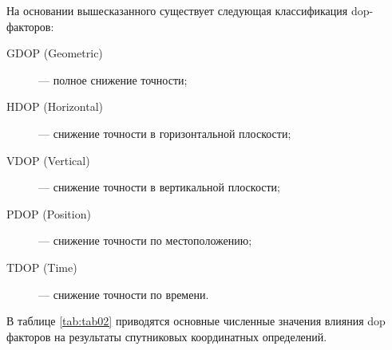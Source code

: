 \vspace{5mm}

На основании вышесказанного существует следующая классификация dop-факторов:

\begin{description}
	\item [GDOP (Geometric)] --- полное снижение точности;
	\item [HDOP (Horizontal)] --- снижение точности в горизонтальной плоскости;
	\item [VDOP (Vertical)] --- снижение точности в вертикальной плоскости;
	\item [PDOP (Position)] --- снижение точности по местоположению;
	\item [TDOP (Time)] --- снижение точности по времени.
\end{description}

\vspace{5mm}

В таблице \cref{tab:tab02} приводятся основные численные значения влияния dop факторов на результаты спутниковых координатных определений.




